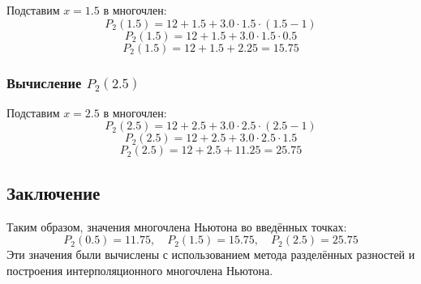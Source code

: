 \documentclass[a4paper,12pt]{article}
\begin{document}
Подставим $x = 1.5$ в многочлен:
\[
P_2(1.5) = 12 + 1.5 + 3.0 \cdot 1.5 \cdot (1.5 - 1)
\]
\[
P_2(1.5) = 12 + 1.5 + 3.0 \cdot 1.5 \cdot 0.5
\]
\[
P_2(1.5) = 12 + 1.5 + 2.25 = 15.75
\]

\subsubsection*{Вычисление $P_2(2.5)$}

Подставим $x = 2.5$ в многочлен:
\[
P_2(2.5) = 12 + 2.5 + 3.0 \cdot 2.5 \cdot (2.5 - 1)
\]
\[
P_2(2.5) = 12 + 2.5 + 3.0 \cdot 2.5 \cdot 1.5
\]
\[
P_2(2.5) = 12 + 2.5 + 11.25 = 25.75
\]

\subsection*{Заключение}

Таким образом, значения многочлена Ньютона во введённых точках:
\[
P_2(0.5) = 11.75, \quad P_2(1.5) = 15.75, \quad P_2(2.5) = 25.75
\]
Эти значения были вычислены с использованием метода разделённых разностей и построения интерполяционного многочлена Ньютона.
\end{document}
